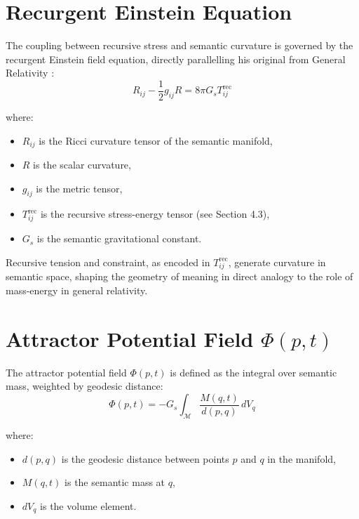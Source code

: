 \section{Recurgent Einstein Equation}

The coupling between recursive stress and semantic curvature is governed by the recurgent Einstein field equation, directly parallelling his original from General Relativity \autocite{Einstein1915, MisnerThorneWheeler1973}:
\begin{equation}
R_{ij} - \frac{1}{2}g_{ij}R = 8\pi G_s T^{\text{rec}}_{ij}
\end{equation}

where:
\begin{itemize}
    \item \(R_{ij}\) is the Ricci curvature tensor of the semantic manifold,
    \item \(R\) is the scalar curvature,
    \item \(g_{ij}\) is the metric tensor,
    \item \(T^{\text{rec}}_{ij}\) is the recursive stress-energy tensor (see Section 4.3),
    \item \(G_s\) is the semantic gravitational constant.
\end{itemize}

Recursive tension and constraint, as encoded in \(T^{\text{rec}}_{ij}\), generate curvature in semantic space, shaping the geometry of meaning in direct analogy to the role of mass-energy in general relativity.

\section[Attractor Potential Field Phi(p, t)]{Attractor Potential Field \(\Phi(p, t)\)}

The attractor potential field \(\Phi(p, t)\) is defined as the integral over semantic mass, weighted by geodesic distance:
\begin{equation}
\Phi(p, t) = -G_s \int_{\mathcal{M}} \frac{M(q, t)}{d(p, q)} \, dV_q
\end{equation}

where:
\begin{itemize}
    \item \(d(p, q)\) is the geodesic distance between points \(p\) and \(q\) in the manifold,
    \item \(M(q, t)\) is the semantic mass at \(q\),
    \item \(dV_q\) is the volume element.
\end{itemize}


